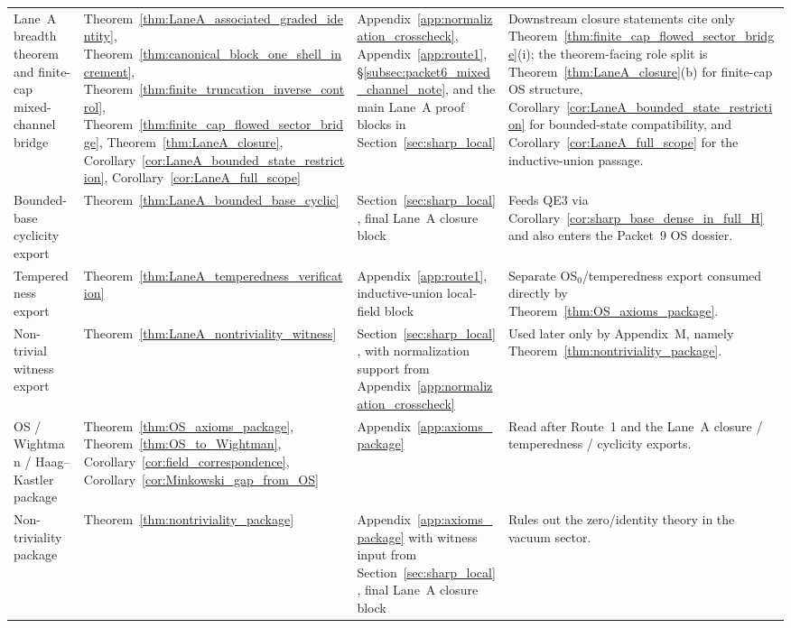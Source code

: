 \begin{longtable}{@{}
>{\RaggedRight\arraybackslash}p{}
>{\RaggedRight\arraybackslash}p{}
>{\RaggedRight\arraybackslash}p{}
>{\RaggedRight\arraybackslash}p{}@{}}
Lane~A breadth theorem and finite-cap mixed-channel bridge & Theorem~\ref{thm:LaneA_associated_graded_identity}, Theorem~\ref{thm:canonical_block_one_shell_increment}, Theorem~\ref{thm:finite_truncation_inverse_control}, Theorem~\ref{thm:finite_cap_flowed_sector_bridge}, Theorem~\ref{thm:LaneA_closure}, Corollary~\ref{cor:LaneA_bounded_state_restriction}, Corollary~\ref{cor:LaneA_full_scope} & Appendix~\ref{app:normalization_crosscheck}, Appendix~\ref{app:route1}, \S\ref{subsec:packet6_mixed_channel_note}, and the main Lane~A proof blocks in Section~\ref{sec:sharp_local} & Downstream closure statements cite only Theorem~\ref{thm:finite_cap_flowed_sector_bridge}(i); the theorem-facing role split is Theorem~\ref{thm:LaneA_closure}(b) for finite-cap OS structure, Corollary~\ref{cor:LaneA_bounded_state_restriction} for bounded-state compatibility, and Corollary~\ref{cor:LaneA_full_scope} for the inductive-union passage.\\[0.35em]

Bounded-base cyclicity export & Theorem~\ref{thm:LaneA_bounded_base_cyclic} & Section~\ref{sec:sharp_local}, final Lane~A closure block & Feeds QE3 via Corollary~\ref{cor:sharp_base_dense_in_full_H} and also enters the Packet~9 OS dossier.\\[0.35em]

Temperedness export & Theorem~\ref{thm:LaneA_temperedness_verification} & Appendix~\ref{app:route1}, inductive-union local-field block & Separate OS$_0$/temperedness export consumed directly by Theorem~\ref{thm:OS_axioms_package}.\\[0.35em]

Non-trivial witness export & Theorem~\ref{thm:LaneA_nontriviality_witness} & Section~\ref{sec:sharp_local}, with normalization support from Appendix~\ref{app:normalization_crosscheck} & Used later only by Appendix~M, namely Theorem~\ref{thm:nontriviality_package}.\\[0.35em]

OS / Wightman / Haag--Kastler package & Theorem~\ref{thm:OS_axioms_package}, Theorem~\ref{thm:OS_to_Wightman}, Corollary~\ref{cor:field_correspondence}, Corollary~\ref{cor:Minkowski_gap_from_OS} & Appendix~\ref{app:axioms_package} & Read after Route~1 and the Lane~A closure / temperedness / cyclicity exports.\\[0.35em]

Non-triviality package & Theorem~\ref{thm:nontriviality_package} & Appendix~\ref{app:axioms_package} with witness input from Section~\ref{sec:sharp_local}, final Lane~A closure block & Rules out the zero/identity theory in the vacuum sector.\\[0.35em]


\end{longtable}
